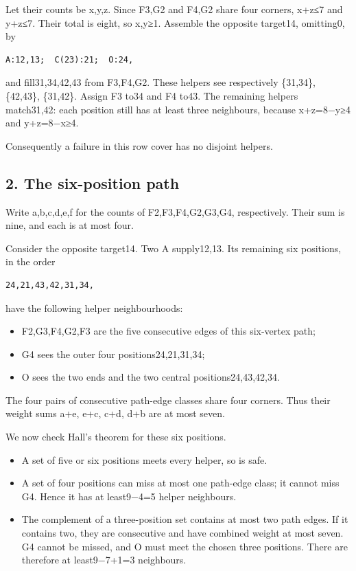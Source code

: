 \documentclass[
  10pt,
]{article}
\providecommand{\tightlist}{%
  \setlength{\itemsep}{0pt}\setlength{\parskip}{0pt}}
\begin{document}
Let their counts be x,y,z. Since F3,G2 and F4,G2 share four corners,
x+z≤7 and y+z≤7. Their total is eight, so x,y≥1. Assemble the opposite
target14, omitting0, by

\begin{verbatim}
A:12,13;  C(23):21;  O:24,
\end{verbatim}

and fill31,34,42,43 from F3,F4,G2. These helpers see respectively
\{31,34\}, \{42,43\}, \{31,42\}. Assign F3 to34 and F4 to43. The
remaining helpers match31,42: each position still has at least three
neighbours, because x+z=8−y≥4 and y+z=8−x≥4.

Consequently a failure in this row cover has no disjoint helpers.

\hypertarget{the-six-position-path}{%
\subsection*{2. The six-position path}\label{the-six-position-path}}

Write a,b,c,d,e,f for the counts of F2,F3,F4,G2,G3,G4, respectively.
Their sum is nine, and each is at most four.

Consider the opposite target14. Two A supply12,13. Its
remaining six positions, in the order

\begin{verbatim}
24,21,43,42,31,34,
\end{verbatim}

have the following helper neighbourhoods:

\begin{itemize}
\tightlist
\item
  F2,G3,F4,G2,F3 are the five consecutive edges of this six-vertex path;
\item
  G4 sees the outer four positions24,21,31,34;
\item
  O sees the two ends and the two central positions24,43,42,34.
\end{itemize}

The four pairs of consecutive path-edge classes share four corners. Thus
their weight sums a+e, e+c, c+d, d+b are at most seven.

We now check Hall's theorem for these six positions.

\begin{itemize}
\tightlist
\item
  A set of five or six positions meets every helper, so is safe.
\item
  A set of four positions can miss at most one path-edge class; it
  cannot miss G4. Hence it has at least9−4=5 helper neighbours.
\item
  The complement of a three-position set contains at most two path
  edges. If it contains two, they are consecutive and have combined
  weight at most seven. G4 cannot be missed, and O must meet the chosen
  three positions. There are therefore at least9−7+1=3 neighbours.
\end{itemize}
\end{document}
